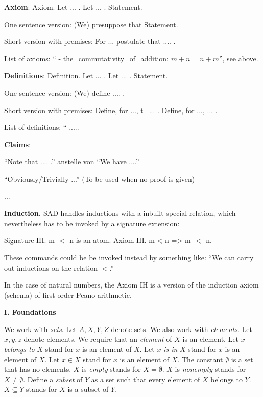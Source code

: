 \documentclass{letter}
\newcommand{\section}[1]{\medskip\bigskip

\noindent\textbf{\LARGE #1}}
\newcommand{\tmem}[1]{{\em #1\/}}
\newcommand{\tmstrong}[1]{\textbf{#1}}
\begin{document}
{\tmstrong{Axiom}}: Axiom. Let ... . Let ... . Statement.

One sentence version: (We) presuppose that Statement.

Short version with premises: For ... postulate that .... .

List of axioms: `` - the\_commutativity\_of\_addition: $m + n = n + m$'', see
above.

{\tmstrong{Definitions}}: Definition. Let ... . Let ... . Statement.

One sentence version: (We) define .... .

Short version with premises: Define, for ..., t=... . Define, for ..., ... .

List of definitions: `` .....

{\tmstrong{Claims}}:

``Note that .... .'' anstelle von ``We have ....''

``Obviously/Trivially ...'' (To be used when no proof is given)

...

{\tmstrong{Induction.}} SAD handles inductions with a inbuilt special
relation, which nevertheless has to be invoked by a signature extension:

Signature IH. m -<- n is an atom. Axiom IH. m < n => m -<- n.

These commands could be be invoked instead by something like: ``We can carry
out inductions on the relation $<$.''

In the case of natural numbers, the Axiom IH is a version of the induction
axiom (schema) of first-order Peano arithmetic.

\section{I. Foundations}

We work with {\tmem{sets}}. Let $A, X, Y, Z$ denote sets. We also work with
{\tmem{elements}}. Let $x, y, z$ denote elements. We require that an
{\tmem{element}} of $X$ is an element. Let $x$ {\tmem{belongs to}} $X$ stand
for $x$ is an element of $X$. Let $x$ {\tmem{is in }}$X$ stand for $x$ is an
element of $X$. Let $x \in X$ stand for $x$ is an element of $X$. The constant
$\emptyset$ is a set that has no elements. $X$ is {\tmem{empty}} stands for $X
= \emptyset$. $X$ is {\tmem{nonempty}} stands for $X \neq \emptyset$. Define a
{\tmem{subset}} of $Y$ as a set such that every element of $X$ belongs to $Y$.
$X \subseteq Y$ stands for $X$ is a subset of $Y$.
\end{document}
